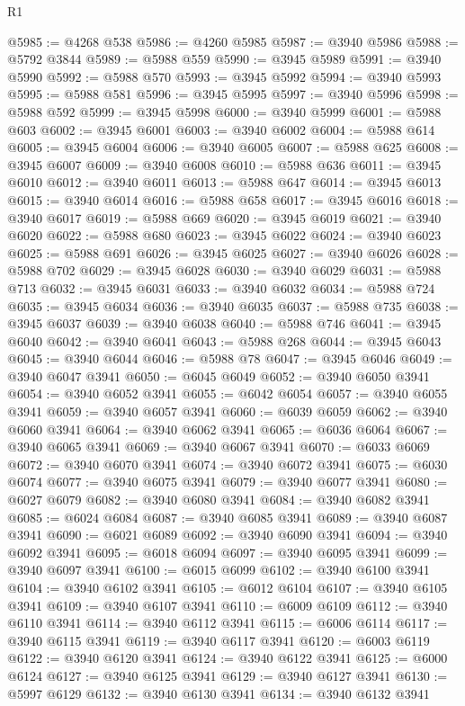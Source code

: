 \begin{lexlean}{R1}
\begin{coremodule}
@5985 := @4268 @538
@5986 := @4260 @5985
@5987 := @3940 @5986
@5988 := @5792 @3844
@5989 := @5988 @559
@5990 := @3945 @5989
@5991 := @3940 @5990
@5992 := @5988 @570
@5993 := @3945 @5992
@5994 := @3940 @5993
@5995 := @5988 @581
@5996 := @3945 @5995
@5997 := @3940 @5996
@5998 := @5988 @592
@5999 := @3945 @5998
@6000 := @3940 @5999
@6001 := @5988 @603
@6002 := @3945 @6001
@6003 := @3940 @6002
@6004 := @5988 @614
@6005 := @3945 @6004
@6006 := @3940 @6005
@6007 := @5988 @625
@6008 := @3945 @6007
@6009 := @3940 @6008
@6010 := @5988 @636
@6011 := @3945 @6010
@6012 := @3940 @6011
@6013 := @5988 @647
@6014 := @3945 @6013
@6015 := @3940 @6014
@6016 := @5988 @658
@6017 := @3945 @6016
@6018 := @3940 @6017
@6019 := @5988 @669
@6020 := @3945 @6019
@6021 := @3940 @6020
@6022 := @5988 @680
@6023 := @3945 @6022
@6024 := @3940 @6023
@6025 := @5988 @691
@6026 := @3945 @6025
@6027 := @3940 @6026
@6028 := @5988 @702
@6029 := @3945 @6028
@6030 := @3940 @6029
@6031 := @5988 @713
@6032 := @3945 @6031
@6033 := @3940 @6032
@6034 := @5988 @724
@6035 := @3945 @6034
@6036 := @3940 @6035
@6037 := @5988 @735
@6038 := @3945 @6037
@6039 := @3940 @6038
@6040 := @5988 @746
@6041 := @3945 @6040
@6042 := @3940 @6041
@6043 := @5988 @268
@6044 := @3945 @6043
@6045 := @3940 @6044
@6046 := @5988 @78
@6047 := @3945 @6046
@6049 := @3940 @6047 @3941
@6050 := @6045 @6049
@6052 := @3940 @6050 @3941
@6054 := @3940 @6052 @3941
@6055 := @6042 @6054
@6057 := @3940 @6055 @3941
@6059 := @3940 @6057 @3941
@6060 := @6039 @6059
@6062 := @3940 @6060 @3941
@6064 := @3940 @6062 @3941
@6065 := @6036 @6064
@6067 := @3940 @6065 @3941
@6069 := @3940 @6067 @3941
@6070 := @6033 @6069
@6072 := @3940 @6070 @3941
@6074 := @3940 @6072 @3941
@6075 := @6030 @6074
@6077 := @3940 @6075 @3941
@6079 := @3940 @6077 @3941
@6080 := @6027 @6079
@6082 := @3940 @6080 @3941
@6084 := @3940 @6082 @3941
@6085 := @6024 @6084
@6087 := @3940 @6085 @3941
@6089 := @3940 @6087 @3941
@6090 := @6021 @6089
@6092 := @3940 @6090 @3941
@6094 := @3940 @6092 @3941
@6095 := @6018 @6094
@6097 := @3940 @6095 @3941
@6099 := @3940 @6097 @3941
@6100 := @6015 @6099
@6102 := @3940 @6100 @3941
@6104 := @3940 @6102 @3941
@6105 := @6012 @6104
@6107 := @3940 @6105 @3941
@6109 := @3940 @6107 @3941
@6110 := @6009 @6109
@6112 := @3940 @6110 @3941
@6114 := @3940 @6112 @3941
@6115 := @6006 @6114
@6117 := @3940 @6115 @3941
@6119 := @3940 @6117 @3941
@6120 := @6003 @6119
@6122 := @3940 @6120 @3941
@6124 := @3940 @6122 @3941
@6125 := @6000 @6124
@6127 := @3940 @6125 @3941
@6129 := @3940 @6127 @3941
@6130 := @5997 @6129
@6132 := @3940 @6130 @3941
@6134 := @3940 @6132 @3941

\end{coremodule}
\end{lexlean}
